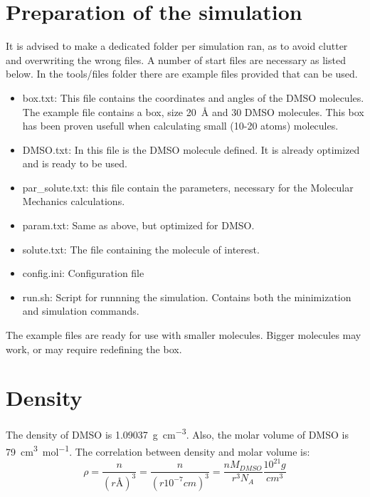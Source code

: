 \documentclass[a4paper,fleqn]{report}
\begin{document}
	
	\section{Preparation of the simulation}
	It is advised to make a dedicated folder per simulation ran, as to avoid 
	clutter and overwriting the wrong files.
	A number of start files are necessary as listed below.
	In the tools/files folder there are example files provided that can be 
	used.
	
	\begin{itemize}
		\setlength{\itemsep}{-1pt}
		\setlength{\parsep}{-1pt}
		\item box.txt: This file contains the coordinates and angles of the 
		DMSO molecules. The example file contains a box, size 
		\SI{20}{\angstrom} and 30 DMSO molecules.
		This box has been proven usefull when calculating 
		small (10-20 atoms) molecules.
		\item DMSO.txt: In this file is the DMSO molecule defined. It is 
		already optimized and is ready to be used.
		\item par\_solute.txt: this file contain the parameters, necessary for 
		the Molecular Mechanics calculations.\cite{Robertson2015}
		\item param.txt: Same as above, but optimized for DMSO.\cite{Liu1995}
		\item solute.txt: The file containing the molecule of interest.
		\item config.ini: Configuration file
		\item run.sh: Script for runnning the simulation. Contains both the 
		minimization and simulation commands.
	\end{itemize}
	
	The example files are ready for use with smaller molecules.
	Bigger molecules may work, or may require redefining the box.
	
	\section{Density}
	The density of DMSO is \SI{1.09037}{g cm^{-3}}.\cite{Radhamma2008}
	Also, the molar volume of DMSO is \SI{79}{cm^3 mol^{-1}}.
	The correlation between density and molar volume is:
	\begin{equation}
	\rho = \dfrac{n}{(r \si{\angstrom})^3} = \dfrac{n}{(r \si{10^{-7} 
	cm})^3} = \dfrac{n M_{DMSO}}{r^3 N_A} \dfrac{10^{21} g}{cm^3}
	\end{equation}

	\newpage
	\begin{spacing}{0.75}
		\label{Referenties}
		\clearpage
		\renewcommand{\bibname}{Referenties}
		
	\end{spacing}
	
	
\end{document}
